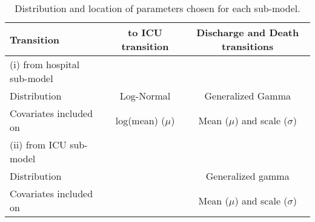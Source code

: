 \begin{table}[htbp!]
    \caption{\label{tab:hosp-parameters}Distribution and location of parameters chosen for each sub-model.}
    \centering
    \begin{tabular}{l c c}
        \toprule
    Transition             & to ICU transition & Discharge and Death transitions\\
        \midrule
        (i) from hospital sub-model & {} & {}         \\

        \hspace{1em} Distribution       & Log-Normal   & Generalized Gamma \\

        \hspace{1em} Covariates included on & log(mean) ($\mu$) & Mean ($\mu$) and scale ($\sigma$) \\

        (ii) from ICU sub-model & {} & {} \\

        \hspace{1em} Distribution         & {}  & Generalized gamma          \\

        \hspace{1em} Covariates included on & {} & Mean ($\mu$) and scale ($\sigma$) \\

        \bottomrule
    \end{tabular}
\end{table}
